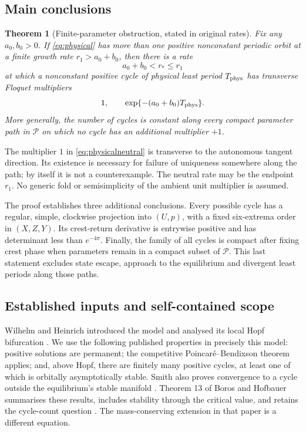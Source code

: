\documentclass[11pt,a4paper]{article}
\numberwithin{equation}{section}
\newtheorem{theorem}{Theorem}[section]
\theoremstyle{remark}\newtheorem{remark}[theorem]{Remark}
\newcommand{\cP}{\mathcal P}
\begin{document}
\subsection{Main conclusions}
\begin{theorem}[Finite-parameter obstruction, stated in original rates]\label{thm:main}
Fix any $a_0,b_0>0$. If \eqref{eq:physical} has more than one positive nonconstant periodic orbit at a finite growth rate $r_1>a_0+b_0$, then there is a rate
\[
a_0+b_0<r_*\le r_1
\]
at which a nonconstant positive cycle of physical least period $T_{\rm phys}$ has transverse Floquet multipliers
\begin{equation}\label{eq:physicalneutral}
1,\qquad \exp\{-(a_0+b_0)T_{\rm phys}\}.
\end{equation}
More generally, the number of cycles is constant along every compact parameter path in $\cP$ on which no cycle has an additional multiplier $+1$.
\end{theorem}
The multiplier $1$ in \eqref{eq:physicalneutral} is transverse to the autonomous tangent direction. Its existence is necessary for failure of uniqueness somewhere along the path; by itself it is not a counterexample. The neutral rate may be the endpoint $r_1$. No generic fold or semisimplicity of the ambient unit multiplier is assumed.

The proof establishes three additional conclusions. Every possible cycle has a regular, simple, clockwise projection into $(U,p)$, with a fixed six-extrema order in $(X,Z,Y)$. Its crest-return derivative is entrywise positive and has determinant less than $e^{-4\pi}$. Finally, the family of all cycles is compact after fixing crest phase when parameters remain in a compact subset of $\cP$. This last statement excludes state escape, approach to the equilibrium and divergent least periods along those paths.

\subsection{Established inputs and self-contained scope}
Wilhelm and Heinrich introduced the model and analysed its local Hopf bifurcation \cite{WH95,WH96}. We use the following published properties in precisely this model: positive solutions are permanent; the competitive Poincar\'e--Bendixson theorem applies; and, above Hopf, there are finitely many positive cycles, at least one of which is orbitally asymptotically stable. Smith also proves convergence to a cycle outside the equilibrium's stable manifold \cite[Theorems 1.1, 1.3 and 1.4]{Smith12}. Theorem 13 of Boros and Hofbauer summarises these results, includes stability through the critical value, and retains the cycle-count question \cite{BH23}. The mass-conserving extension in that paper is a different equation.
\end{document}
